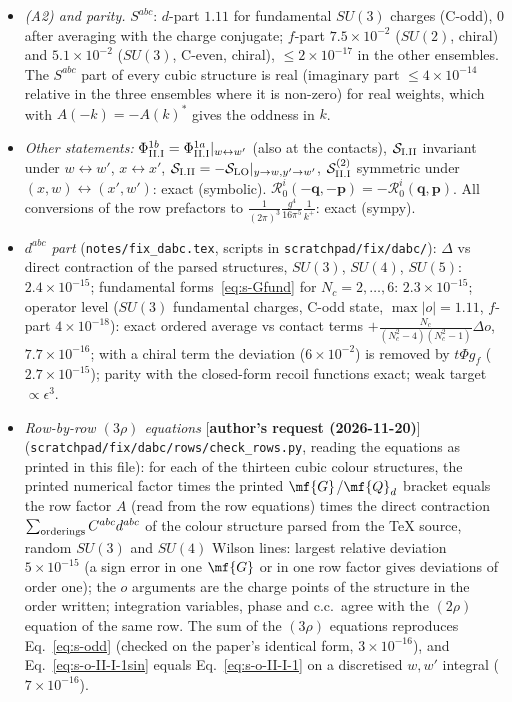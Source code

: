 {\begin{itemize}
\item \emph{(A2) and parity.} $S^{abc}$: $d$-part $1.11$ for fundamental $SU(3)$ charges (C-odd), $0$ after averaging with the charge conjugate; $f$-part $7.5\times10^{-2}$ ($SU(2)$, chiral) and $5.1\times10^{-2}$ ($SU(3)$, C-even, chiral), $\le2\times10^{-17}$ in the other ensembles. The $S^{abc}$ part of every cubic structure is real (imaginary part $\le4\times10^{-14}$ relative in the three ensembles where it is non-zero) for real weights, which with $A(-k)=-A(k)^{*}$ gives the oddness in $k$.
\item \emph{Other statements:} $\Phi^{1b}_{\rm II.I}=\Phi^{1a}_{\rm II.I}|_{w\leftrightarrow w'}$ (also at the contacts), $\mathcal{S}_{\rm I.II}$ invariant under $w\leftrightarrow w'$, $x\leftrightarrow x'$, $\mathcal{S}_{\rm I.II}=-\mathcal{S}_{\rm LO}|_{y\to w,y'\to w'}$, $\mathcal{S}^{(2)}_{\rm II.I}$ symmetric under $(x,w)\leftrightarrow(x',w')$: exact (symbolic). $\mathcal{R}^{i}_{0}(-\mathbf{q},-\mathbf{p})=-\mathcal{R}^{i}_{0}(\mathbf{q},\mathbf{p})$. All conversions of the row prefactors to $\frac{1}{(2\pi)^{3}}\frac{g^{4}}{16\pi^{5}}\frac{1}{k^{+}}$: exact (sympy).
\item \emph{$d^{abc}$ part} (\texttt{notes/fix\_dabc.tex}, scripts in \texttt{scratchpad/fix/dabc/}): $\Delta$ vs direct contraction of the parsed structures, $SU(3)$, $SU(4)$, $SU(5)$: $2.4\times10^{-15}$; fundamental forms~\eqref{eq:s-Gfund} for $N_{c}=2,\dots,6$: $2.3\times10^{-15}$; operator level ($SU(3)$ fundamental charges, C-odd state, $\max|o|=1.11$, $f$-part $4\times10^{-18}$): exact ordered average vs contact terms $+\frac{N_{c}}{(N_{c}^{2}-4)(N_{c}^{2}-1)}\Delta o$, $7.7\times10^{-16}$; with a chiral term the deviation ($6\times10^{-2}$) is removed by $t\Phi g_{f}$ ($2.7\times10^{-15}$); parity with the closed-form recoil functions exact; weak target $\propto\epsilon^{3}$.
\item \emph{Row-by-row $(3\rho)$ equations} [\textbf{author's request (2026-11-20)}] (\texttt{scratchpad/fix/dabc/rows/check\_rows.py}, reading the equations as printed in this file): for each of the thirteen cubic colour structures, the printed numerical factor times the printed $\mf{G}$/$\mf{Q}_{d}$ bracket equals the row factor $A$ (read from the row equations) times the direct contraction $\sum_{\rm orderings}C^{abc}d^{abc}$ of the colour structure parsed from the TeX source, random $SU(3)$ and $SU(4)$ Wilson lines: largest relative deviation $5\times10^{-15}$ (a sign error in one $\mf{G}$ or in one row factor gives deviations of order one); the $o$ arguments are the charge points of the structure in the order written; integration variables, phase and c.c.\ agree with the $(2\rho)$ equation of the same row. The sum of the $(3\rho)$ equations reproduces Eq.~\eqref{eq:s-odd} (checked on the paper's identical form, $3\times10^{-16}$), and Eq.~\eqref{eq:s-o-II-I-1sin} equals Eq.~\eqref{eq:s-o-II-I-1} on a discretised $w,w'$ integral ($7\times10^{-16}$).

\end{itemize}}
